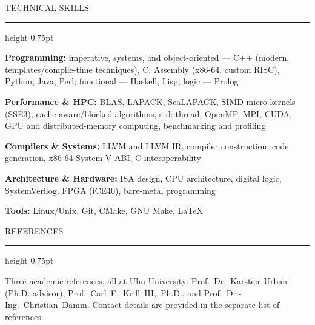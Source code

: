 \documentclass[10pt]{article}
\newcommand{\headsize}{\fontsize{10.5pt}{12.8pt}\selectfont}  %
\newcommand{\looser}{\linespread{1.0417}\selectfont}
\newcommand{\cvsection}[1]{%
  \par\vspace{9pt}%
  {\headsize\bfseries\color{heading}\strut#1\par}%
  \nopagebreak\vspace{1pt}%
  {\color{rule}\hrule height 0.75pt}%
  \nopagebreak\vspace{3pt}%
  \prevdepth=2.7pt\relax %
}
\newcommand{\cvtext}[2][]{%
  {#1\looser #2\par}%
  \vspace{2pt}%
}
\begin{document}
\cvsection{TECHNICAL SKILLS}

\cvtext{\textbf{Programming:} imperative, systems, and object-oriented — C++ (modern, templates/compile-time techniques), C, Assembly (x86-64, custom RISC), Python, Java, Perl; functional — Haskell, Lisp; logic — Prolog}

\cvtext{\textbf{Performance \& HPC:} BLAS, LAPACK, ScaLAPACK, SIMD micro-kernels (SSE3), cache-aware/blocked algorithms, std::thread, OpenMP, MPI, CUDA, GPU and distributed-memory computing, benchmarking and profiling}

\cvtext{\textbf{Compilers \& Systems:} LLVM and LLVM IR, compiler construction, code generation, x86-64 System V ABI, C interoperability}

\cvtext{\textbf{Architecture \& Hardware:} ISA design, CPU architecture, digital logic, SystemVerilog, FPGA (iCE40), bare-metal programming}

\cvtext{\textbf{Tools:} Linux/Unix, Git, CMake, GNU Make, LaTeX}

\cvsection{REFERENCES}

\cvtext{Three academic references, all at Ulm University: \mbox{Prof. Dr. Karsten Urban} (Ph.D. advisor), \mbox{Prof. Carl E. Krill III, Ph.D.}, and \mbox{Prof. Dr.-Ing. Christian Damm}. Contact details are provided in the separate list of references.}
\end{document}
